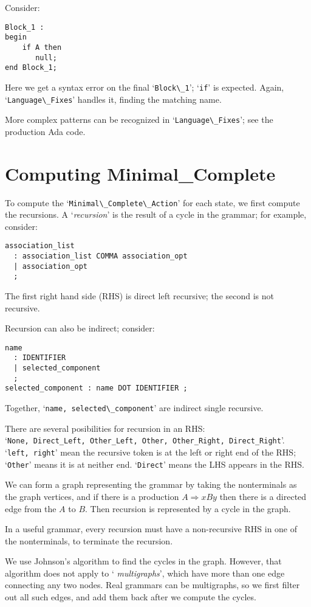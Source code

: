 \documentclass{article}
\newcommand{\code}[1]{`\lstinline|#1|'}
\begin{document}
Consider:
\begin{lstlisting}
Block_1 :
begin
    if A then
       null;
end Block_1;
\end{lstlisting}
Here we get a syntax error on the final \code{Block\_1}; \code{if} is
expected. Again, \code{Language\_Fixes} handles it, finding the
matching name.

More complex patterns can be recognized in \code{Language\_Fixes}; see
the production Ada code.

\section{Computing Minimal\_Complete}
\label{minimal-complete-compute}
To compute the \code{Minimal\_Complete\_Action} for each state, we
first compute the recursions. A `{\it recursion}' is the result of a
cycle in the grammar; for example, consider:
\begin{verbatim}
association_list
  : association_list COMMA association_opt
  | association_opt
  ;
\end{verbatim}
The first right hand side (RHS) is direct left recursive; the second
is not recursive.

Recursion can also be indirect; consider:
\begin{verbatim}
name
  : IDENTIFIER
  | selected_component
  ;
selected_component : name DOT IDENTIFIER ;
\end{verbatim}
Together, \code{name, selected\_component} are indirect single recursive.

There are several posibilities for recursion in an RHS:\\ \code{None,
Direct_Left, Other_Left, Other, Other_Right, Direct_Right}.\\ \code{left, right}
mean the recursive token is at the left or right end of the RHS;
\code{Other} means it is at neither end. \code{Direct} means the LHS
appears in the RHS.

We can form a graph representing the grammar by taking the
nonterminals as the graph vertices, and if there is a production $A
\Rightarrow xBy$ then there is a directed edge from the $A$ to $B$.
Then recursion is represented by a cycle in the graph.

In a useful grammar, every recursion must have a non-recursive
RHS in one of the nonterminals, to terminate the recursion.

We use Johnson's algorithm \cite{graph-cycles} to find the cycles in
the graph. However, that algorithm does not apply to `{\it
  multigraphs}', which have more than one edge connecting any two
nodes. Real grammars can be multigraphs, so we first filter out all
such edges, and add them back after we compute the cycles.
\end{document}
